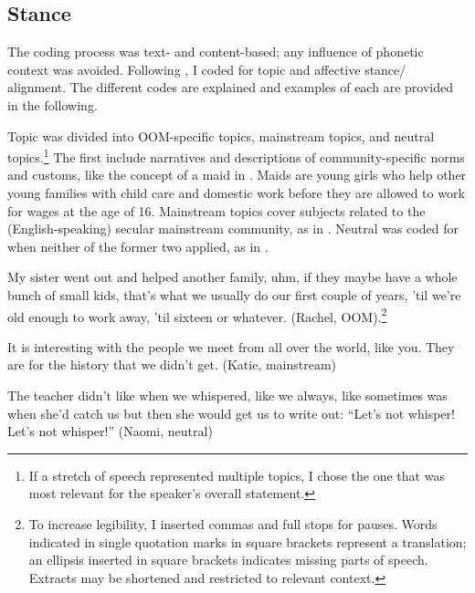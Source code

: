 \documentclass[output=paper]{langscibook}
\begin{document}
\subsection{Stance}\label{neuhausen:sec:4.3}
The coding process was text- and content-based; any influence of phonetic context was avoided. Following \citet{nycz_stylistic_2018}, I coded for topic and affective stance/ alignment. The different codes are explained and examples of each are provided in the following. 

Topic was divided into \gls*{OOM}-specific topics, mainstream topics, and neutral topics.\footnote{If a stretch of speech represented multiple topics, I chose the one that was most relevant for the speaker’s overall statement.} The first include narratives and descriptions of community-specific norms and customs, like the concept of a maid in . Maids are young girls who help other young families with child care and domestic work before they are allowed to work for wages at the age of 16. Mainstream topics cover subjects related to the (English-speaking) secular mainstream community, as in . Neutral was coded for when neither of the former two applied, as in .

\begin{exe}
    \ex\label{neuhausen:ex:1} My sister went out and helped another family, uhm, if they maybe have a whole bunch of small kids, that’s what we usually do our first couple of years, ’til we’re old enough to work away, ’til sixteen or whatever. (Rachel, \gls*{OOM}).\footnote{To increase legibility, I inserted commas and full stops for pauses. Words indicated in single quotation marks in square brackets represent a translation; an ellipsis inserted in square brackets indicates missing parts of speech. Extracts may be shortened and restricted to relevant context.}

    \ex\label{neuhausen:ex:2} It is interesting with the people we meet from all over the world, like you. They are for the history that we didn’t get. (Katie, mainstream)

    \ex\label{neuhausen:ex:3} The teacher didn’t like when we whispered, like we always, like sometimes was when she’d catch us but then she would get us to write out: “Let’s not whisper! Let’s not whisper!” (Naomi, neutral)
\end{exe}
\end{document}
